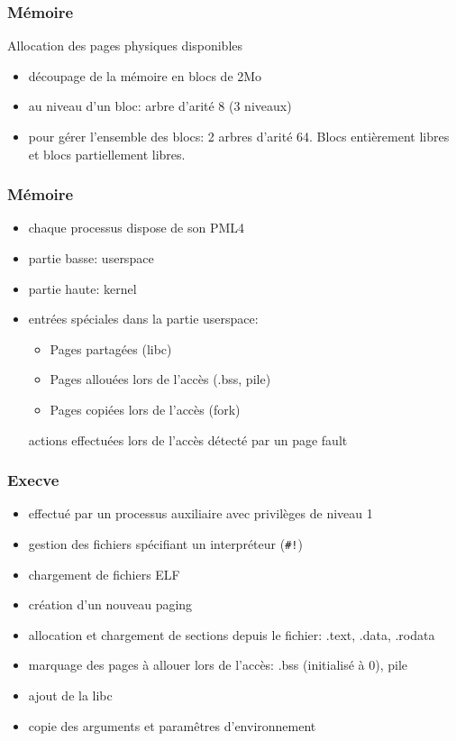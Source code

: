 \documentclass[10pt,a4paper]{beamer}
\begin{document}
\begin{frame}
\begin{tikzpicture}
  \end{tikzpicture}
\end{frame}

\begin{frame}
  \frametitle{Mémoire}
  Allocation des pages physiques disponibles

  \begin{itemize}
  \item découpage de la mémoire en blocs de 2Mo
  \item au niveau d'un bloc: arbre d'arité 8 (3 niveaux)
  \item pour gérer l'ensemble des blocs:
    2 arbres d'arité 64. Blocs entièrement libres et blocs partiellement libres.
  \end{itemize}
\end{frame}

\begin{frame}
  \frametitle{Mémoire}

  \begin{itemize}
  \item chaque processus dispose de son PML4
  \item partie basse: userspace
  \item partie haute: kernel
  \item entrées spéciales dans la partie userspace:
    \begin{itemize}
    \item Pages partagées (libc)
    \item Pages allouées lors de l'accès (.bss, pile)
    \item Pages copiées lors de l'accès (fork)
    \end{itemize}
    actions effectuées lors de l'accès détecté par un page fault
  \end{itemize}
\end{frame}

\begin{frame}
  \frametitle{Execve}
  \begin{itemize}
  \item effectué par un processus auxiliaire avec privilèges de niveau 1
  \item gestion des fichiers spécifiant un interpréteur (\texttt{\#!})
  \item chargement de fichiers ELF
  \item création d'un nouveau paging
  \item allocation et chargement de sections depuis le fichier: .text, .data, .rodata
  \item marquage des pages à allouer lors de l'accès: .bss (initialisé à 0), pile
  \item ajout de la libc
  \item copie des arguments et paramêtres d'environnement
  \end{itemize}
\end{frame}
\end{document}
